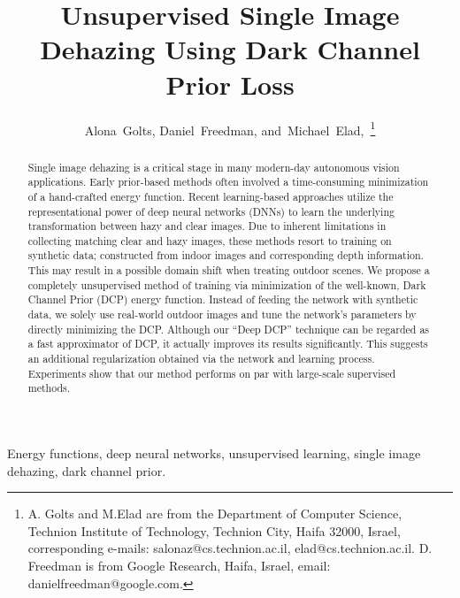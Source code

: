 \documentclass[10pt,twocolumn,twoside]{IEEEtran}
\begin{document}
\title{Unsupervised Single Image Dehazing Using Dark Channel Prior Loss\\}

\author{Alona~Golts,
        Daniel~Freedman,
        and~Michael~Elad,~\thanks{A. Golts and M.Elad are from the Department
of Computer Science, Technion Institute of Technology, Technion City, Haifa 32000, Israel,
corresponding e-mails: salonaz@cs.technion.ac.il, elad@cs.technion.ac.il.
D. Freedman is from Google Research, Haifa, Israel, email: danielfreedman@google.com.}}


\maketitle

\begin{abstract}
Single image dehazing is a critical stage in many modern-day autonomous vision applications. Early prior-based methods often involved a time-consuming minimization of a hand-crafted energy function. Recent learning-based approaches utilize the representational power of deep neural networks (DNNs) to learn the underlying transformation between hazy and clear images. Due to inherent limitations in collecting matching clear and hazy images, these methods resort to training on synthetic data; constructed from indoor images and corresponding depth information. This may result in a possible domain shift when treating outdoor scenes. We propose a completely unsupervised method of training via minimization of the well-known, Dark Channel Prior (DCP) energy function. Instead of feeding the network with synthetic data, we solely use real-world outdoor images and tune the network's parameters by directly minimizing the DCP. Although our ``Deep DCP'' technique can be regarded as a fast approximator of DCP, it actually improves its results significantly. This suggests an additional regularization obtained via the network and learning process. Experiments show that our method performs on par with large-scale supervised methods.

\end{abstract}

\begin{IEEEkeywords}
Energy functions, deep neural networks, unsupervised learning, single image dehazing, dark channel prior.
\end{IEEEkeywords}
\end{document}
